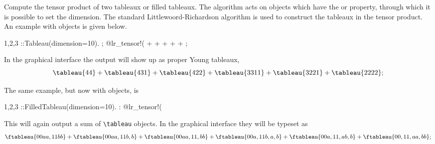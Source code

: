 
Compute the tensor product of two tableaux or filled tableaux. The
algorithm acts on objects which have the 
or  property, through which it is possible to
set the dimension. The standard Littlewoord-Richardson algorithm is
used to construct the tableaux in the tensor product. An example
with  objects is given below.
\begin{screen}{1,2,3}
\tableau{#}::Tableau(dimension=10).
 ;
@lr_tensor!(%
 +  +  
     +  +  
     + ;
\end{screen}
In the graphical interface the output will show up as proper Young tableaux,
\begin{equation}
\tableau{4 4} + \tableau{4 3 1} + \tableau{4 2 2} + \tableau{3 3 1 1} + \tableau{3 2 2 1} + \tableau{2 2 2 2};
\end{equation}

The same example, but now with  objects, is
\begin{screen}{1,2,3}
\tableau{#}::FilledTableau(dimension=10).
 :
@lr_tensor!(%
\end{screen}
This will again output a sum of \verb|\tableau| objects. In the graphical
interface they will be typeset as
\begin{equation}
\ftableau{{0}{0}{a}{a},{1}{1}{b}{b}} + \ftableau{{0}{0}{a}{a},{1}{1}{b},{b}} + \ftableau{{0}{0}{a}{a},{1}{1},{b}{b}} + \ftableau{{0}{0}{a},{1}{1}{b},{a},{b}} + \ftableau{{0}{0}{a},{1}{1},{a}{b},{b}} + \ftableau{{0}{0},{1}{1},{a}{a},{b}{b}};
\end{equation}


